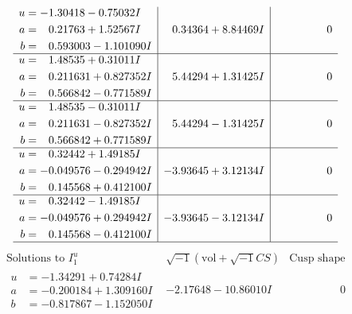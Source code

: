 \documentclass[1p]{elsarticle_modified}
\theoremstyle{definition}
\newcommand{\I}{\sqrt{-1}}
\begin{document}
$$\begin{array}{c|c|c}
\begin{aligned}
u &= -1.30418 - 0.75032 I \\
a &= \phantom{-}0.21763 + 1.52567 I \\
b &= \phantom{-}0.593003 - 1.101090 I\end{aligned}
 & \phantom{-}0.34364 + 8.84469 I & \phantom{-0.000000 } 0 \\ \hline\begin{aligned}
u &= \phantom{-}1.48535 + 0.31011 I \\
a &= \phantom{-}0.211631 + 0.827352 I \\
b &= \phantom{-}0.566842 - 0.771589 I\end{aligned}
 & \phantom{-}5.44294 + 1.31425 I & \phantom{-0.000000 } 0 \\ \hline\begin{aligned}
u &= \phantom{-}1.48535 - 0.31011 I \\
a &= \phantom{-}0.211631 - 0.827352 I \\
b &= \phantom{-}0.566842 + 0.771589 I\end{aligned}
 & \phantom{-}5.44294 - 1.31425 I & \phantom{-0.000000 } 0 \\ \hline\begin{aligned}
u &= \phantom{-}0.32442 + 1.49185 I \\
a &= -0.049576 - 0.294942 I \\
b &= \phantom{-}0.145568 + 0.412100 I\end{aligned}
 & -3.93645 + 3.12134 I & \phantom{-0.000000 } 0 \\ \hline\begin{aligned}
u &= \phantom{-}0.32442 - 1.49185 I \\
a &= -0.049576 + 0.294942 I \\
b &= \phantom{-}0.145568 - 0.412100 I\end{aligned}
 & -3.93645 - 3.12134 I & \phantom{-0.000000 } 0\\
 \hline 
 \end{array}$$\newpage$$\begin{array}{c|c|c}  
\text{Solutions to }I^u_{1}& \I (\text{vol} + \sqrt{-1}CS) & \text{Cusp shape}\\
 \hline 
\begin{aligned}
u &= -1.34291 + 0.74284 I \\
a &= -0.200184 + 1.309160 I \\
b &= -0.817867 - 1.152050 I\end{aligned}
 & -2.17648 - 10.86010 I & \phantom{-0.000000 } 0 \\ \hline\begin{aligned}

\end{aligned}
\end{array}$$
\end{document}
